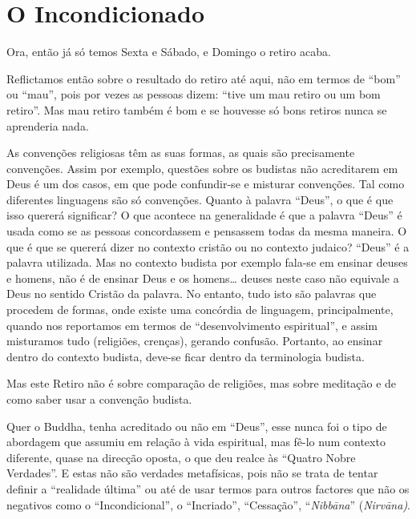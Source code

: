 \chapter{O Incondicionado}

Ora, então já só temos Sexta e Sábado, e Domingo o retiro acaba.

Reflictamos então sobre o resultado do retiro até aqui, não em termos de
``bom'' ou ``mau'', pois por vezes as pessoas dizem: ``tive um mau
retiro ou um bom retiro''. Mas mau retiro também é bom e se houvesse só
bons retiros nunca se aprenderia nada.

As convenções religiosas têm as suas formas, as quais são precisamente
convenções. Assim por exemplo, questões sobre os budistas não
acreditarem em Deus é um dos casos, em que pode confundir-se e misturar
convenções. Tal como diferentes linguagens são só convenções. Quanto à
palavra ``Deus'', o que é que isso quererá significar? O que acontece na
generalidade é que a palavra ``Deus'' é usada como se as pessoas
concordassem e pensassem todas da mesma maneira. O que é que se quererá
dizer no contexto cristão ou no contexto judaico? ``Deus'' é a palavra
utilizada. Mas no contexto budista por exemplo fala-se em ensinar deuses
e homens, não é de ensinar Deus e os homens\ldots{} deuses neste caso não
equivale a Deus no sentido Cristão da palavra. No entanto, tudo isto são
palavras que procedem de formas, onde existe uma concórdia de linguagem,
principalmente, quando nos reportamos em termos de ``desenvolvimento
espiritual'', e assim misturamos tudo (religiões, crenças), gerando
confusão. Portanto, ao ensinar dentro do contexto budista, deve-se ficar
dentro da terminologia budista.

Mas este Retiro não é sobre comparação de religiões, mas sobre meditação
e de como saber usar a convenção budista.

Quer o Buddha, tenha acreditado ou não em ``Deus'', esse nunca foi o
tipo de abordagem que assumiu em relação à vida espiritual, mas fê-lo
num contexto diferente, quase na direcção oposta, o que deu realce às
``Quatro Nobre Verdades''. E estas não são verdades metafísicas, pois
não se trata de tentar definir a ``realidade última'' ou até de usar
termos para outros factores que não os negativos como o
``Incondicional'', o ``Incriado'', ``Cessação'', ``\emph{Nibbāna}''
(\emph{Nirvāna)}.

